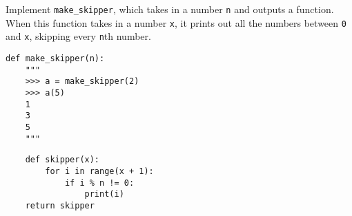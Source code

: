 \begin{blocksection}
\question Implement \lstinline$make_skipper$, which takes in a number
\lstinline$n$ and outputs a function. When this function takes in a number
\lstinline$x$, it prints out all the numbers between \lstinline$0$ and
\lstinline$x$, skipping every \lstinline$n$th number.

\begin{lstlisting}
def make_skipper(n):
    """
    >>> a = make_skipper(2)
    >>> a(5)
    1
    3
    5
    """
\end{lstlisting}

\begin{solution}[1in]
\begin{lstlisting}
    def skipper(x):
        for i in range(x + 1):
            if i % n != 0:
                print(i)
    return skipper
\end{lstlisting}
\end{solution}
\end{blocksection}
